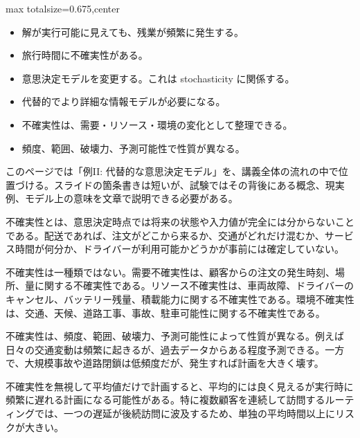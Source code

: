 \clearpage
{}
\begin{adjustbox}{max totalsize={\textwidth}{0.675\textheight},center}
\begin{minipage}{\textwidth}\scriptsize
\begin{minipage}[t]{0.485\textwidth}
\begin{itemize}
\item 解が実行可能に見えても、残業が頻繁に発生する。
\item 旅行時間に不確実性がある。
\item 意思決定モデルを変更する。これは stochasticity に関係する。
\item 代替的でより詳細な情報モデルが必要になる。
\end{itemize}
\begin{itemize}
\item 不確実性は、需要・リソース・環境の変化として整理できる。
\item 頻度、範囲、破壊力、予測可能性で性質が異なる。
\end{itemize}
\end{minipage}\hfill
\begin{minipage}[t]{0.485\textwidth}
このページでは「例II: 代替的な意思決定モデル」を、講義全体の流れの中で位置づける。スライドの箇条書きは短いが、試験ではその背後にある概念、現実例、モデル上の意味を文章で説明できる必要がある。\par
不確実性とは、意思決定時点では将来の状態や入力値が完全には分からないことである。配送であれば、注文がどこから来るか、交通がどれだけ混むか、サービス時間が何分か、ドライバーが利用可能かどうかが事前には確定していない。\par
不確実性は一種類ではない。需要不確実性は、顧客からの注文の発生時刻、場所、量に関する不確実性である。リソース不確実性は、車両故障、ドライバーのキャンセル、バッテリー残量、積載能力に関する不確実性である。環境不確実性は、交通、天候、道路工事、事故、駐車可能性に関する不確実性である。\par
不確実性は、頻度、範囲、破壊力、予測可能性によって性質が異なる。例えば日々の交通変動は頻繁に起きるが、過去データからある程度予測できる。一方で、大規模事故や道路閉鎖は低頻度だが、発生すれば計画を大きく壊す。\par
不確実性を無視して平均値だけで計画すると、平均的には良く見えるが実行時に頻繁に遅れる計画になる可能性がある。特に複数顧客を連続して訪問するルーティングでは、一つの遅延が後続訪問に波及するため、単独の平均時間以上にリスクが大きい。\par

\end{minipage}
\end{minipage}
\end{adjustbox}
